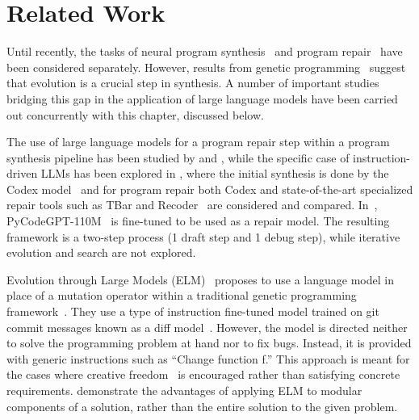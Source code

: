 
\newpage\section{Related Work}
\label{sec:seidr-related-work}


Until recently, the tasks of neural program synthesis~\cite{gulwaniProgramSynthesis2017} and program repair~\cite{gouesAutomatedProgramRepair2019,petke2018:genetic,legouesSystematicStudyAutomated2012,zhangSystematicLiteratureReview2024} have been considered separately.
However, results from genetic programming~\cite{sobaniaRecentDevelopmentsProgram2021} suggest that evolution is a crucial step in synthesis.
A number of important studies bridging this gap in the application of large language models have been carried out concurrently with this chapter, discussed below.

The use of large language models for a program repair step within a program synthesis pipeline has been studied by \cite{joshi2022:repair} and \cite{guptaSynthesizeExecuteDebug2020},  while the specific case of instruction-driven LLMs has been explored in \cite{fanAutomatedRepairPrograms2023}, where the initial synthesis is done by the Codex model~\cite{chenEvaluatingLargeLanguage2021} and for program repair both Codex and state-of-the-art specialized repair tools such as TBar and Recoder~\cite{justDefects4JDatabaseExisting2014} are considered and compared. 
In~\cite{zhangSelfEditFaultAwareCode2023}, PyCodeGPT-110M~\cite{zanCERTContinualPretraining2022} is fine-tuned to be used as a repair model. 
The resulting framework is a two-step process (1 draft step and 1 debug step), while iterative evolution and search are not explored. 

Evolution through Large Models (ELM)~\cite{lehmanEvolutionLargeModels2022} proposes to use a language model in place of a mutation operator within a traditional genetic programming framework~\cite{koza1994:genetic}. They use a type of instruction fine-tuned model trained on git commit messages known as a diff model~\cite{DiffModelsNew2023}. 
However, the model is directed neither to solve the programming problem at hand nor to fix bugs.
Instead, it is provided with generic instructions such as ``Change function f.'' 
This approach is meant for the cases where creative freedom~\cite{stanleyWhyGreatnessCannot2015} is encouraged rather than satisfying concrete requirements.
\cite{liuAlgorithmEvolutionUsing2023} demonstrate the advantages of applying ELM to modular components of a solution, rather than the entire solution to the given problem.

